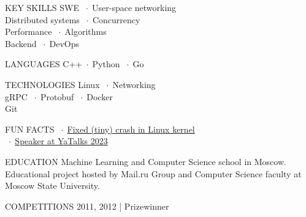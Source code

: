 \documentclass[12pt]{cutecv}
\author{Svyatoslav Feldsherov}
\newcommand{\listbullet}{$\; \cdot \;$}
\begin{document}
\maketitle

\begin{paracol}{2}
\setlength{\columnsep}{2em}
\setlength{\cvsectionverticalskip}{1mm}
\setlength{\cvinfoverticalskip}{1mm}

\begin{leftcolumn}
\begin{cvsection}{KEY SKILLS}
   SWE \listbullet User-space networking  \\
   Distributed systems \listbullet Concurrency  \\
   Performance \listbullet Algorithms \\
   Backend \listbullet DevOps 
\end{cvsection}

\begin{cvsection}{LANGUAGES}
  C++\listbullet Python \listbullet Go
\end{cvsection}

\begin{cvsection}{TECHNOLOGIES}
  Linux \listbullet Networking \\
  gRPC \listbullet Protobuf \listbullet Docker \\
  Git \\
\end{cvsection}

\begin{cvsection}{FUN FACTS}
  \listbullet \href{https://lore.kernel.org/lkml/CACgs1VAo5AD-6sw2QCNKhRtoOy99XNP24dAWUrdryJKhCxwsMA@mail.gmail.com/}{Fixed (tiny) crash in Linux kernel} \\
  \listbullet \href{https://yatalks.yandex.ru/en/speakers/svyatoslav-feldsherov}{Speaker at YaTalks 2023} \\
\end{cvsection}

\begin{cvsection}{EDUCATION}
    {Machine Learning and Computer Science school in Moscow.}
   {Educational project hosted
    by Mail.ru Group and Computer Science faculty
    at Moscow State University.}
\end{cvsection}

\begin{cvsection}{COMPETITIONS}
  {2011, 2012 | Prizewinner}
  {}
\end{cvsection}


\end{leftcolumn}
\end{paracol}
\end{document}
